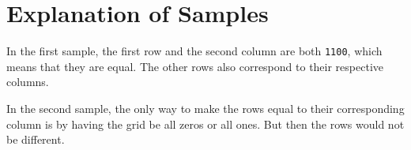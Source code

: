 \section*{Explanation of Samples}

In the first sample, the first row and the second column are both \texttt{1100}, which means that they are equal. 
The other rows also correspond to their respective columns.

In the second sample, the only way to make the rows equal to their corresponding column is by having the 
grid be all zeros or all ones. But then the rows would not be different. 
